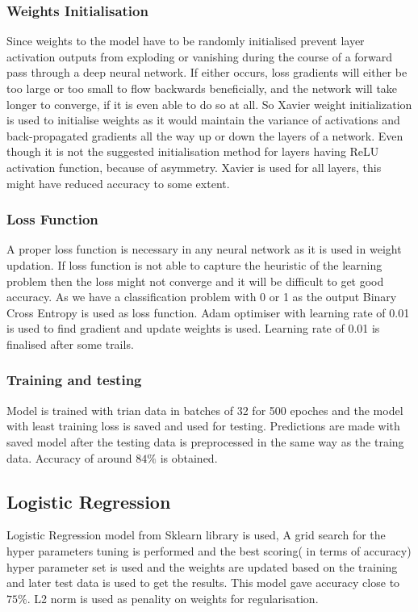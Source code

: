 \documentclass{article}
\begin{document}
\subsubsection{Weights Initialisation}
Since weights to the model have to be randomly initialised prevent layer activation outputs from exploding or vanishing during the course of a forward pass through a deep neural network. If either occurs, loss gradients will either be too large or too small to flow backwards beneficially, and the network will take longer to converge, if it is even able to do so at all. So Xavier weight initialization is used to initialise weights as it  would maintain the variance of activations and back-propagated gradients all the way up or down the layers of a network. Even though it is not the suggested initialisation method for layers having ReLU activation function, because of asymmetry. Xavier is used for all layers, this might have reduced accuracy to some extent. 
\subsubsection{Loss Function}
A proper loss function is necessary in any neural network as it is used in weight updation. If loss function is not able to capture the heuristic of the learning problem then the loss might not converge and it will be difficult to get good accuracy. As we have a classification problem with 0 or 1 as the output Binary Cross Entropy is used as loss function. Adam optimiser with learning rate of 0.01 is used to find gradient and update weights is used. Learning rate of 0.01 is finalised after some trails.
\subsubsection{Training and testing}
Model is trained with trian data in batches of 32 for 500 epoches and the model with least training loss is saved and used for testing. Predictions are made with saved model after the testing data is preprocessed in the same way as the traing data. Accuracy of around $84\%$ is obtained.

\subsection{Logistic Regression}
Logistic Regression model from Sklearn library is used, A grid search for the hyper parameters tuning is performed and the best scoring( in terms of accuracy) hyper parameter set is used and the weights are updated based on the training and later test data is used to get the results. This model gave accuracy close to $75\%$. L2 norm is used as penality on weights for regularisation. 
\end{document}
